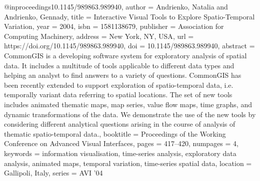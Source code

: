@inproceedings{10.1145/989863.989940,
author = {Andrienko, Natalia and Andrienko, Gennady},
title = {Interactive Visual Tools to Explore Spatio-Temporal Variation},
year = {2004},
isbn = {1581138679},
publisher = {Association for Computing Machinery},
address = {New York, NY, USA},
url = {https://doi.org/10.1145/989863.989940},
doi = {10.1145/989863.989940},
abstract = {CommonGIS is a developing software system for exploratory analysis of spatial data. It includes a multitude of tools applicable to different data types and helping an analyst to find answers to a variety of questions. CommonGIS has been recently extended to support exploration of spatio-temporal data, i.e. temporally variant data referring to spatial locations. The set of new tools includes animated thematic maps, map series, value flow maps, time graphs, and dynamic transformations of the data. We demonstrate the use of the new tools by considering different analytical questions arising in the course of analysis of thematic spatio-temporal data.},
booktitle = {Proceedings of the Working Conference on Advanced Visual Interfaces},
pages = {417–420},
numpages = {4},
keywords = {information visualisation, time-series analysis, exploratory data analysis, animated maps, temporal variation, time-series spatial data},
location = {Gallipoli, Italy},
series = {AVI '04}
}